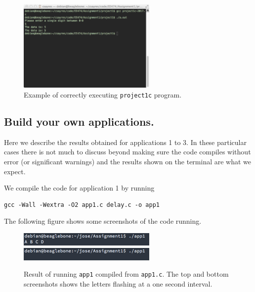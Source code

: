 \documentclass[letterpaper, 12pt]{article}
\begin{document}
\begin{figure}[!ht]
  \centering
  \captionsetup{width=0.8\textwidth}
  \includegraphics[width=0.6\textwidth]{images/proj1c.png}
  \cprotect\caption{Example of correctly executing \verb+project1c+ program.}
 \label{fig:proj1c}
\end{figure}

\subsection{Build your own applications.}

Here we describe the results obtained for applications 1 to 3.  In these particular cases there is not much to discuss beyond making sure the code compiles without error (or significant warnings) and the results shown on the terminal are what we expect.

We compile the code for application 1 by running

\begin{verbatim}
gcc -Wall -Wextra -O2 app1.c delay.c -o app1
\end{verbatim}

\noindent The following figure shows some screenshots of the code running.

\begin{figure}[!ht]
  \centering
  \captionsetup{width=0.8\textwidth}
  \includegraphics[width=0.6\textwidth]{images/app1_1.png}
  \includegraphics[width=0.6\textwidth]{images/app1_2.png}
  \cprotect\caption{Result of running \verb+app1+ compiled from \verb+app1.c+. The top and bottom screenshots shows the letters flashing at a one second interval.}
\end{figure}
\end{document}
